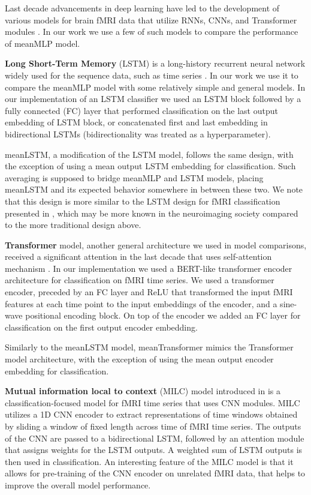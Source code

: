 \documentclass[final,5p,times,twocolumn,authoryear]{elsarticle}
\begin{document}
Last decade advancements in deep learning have led to the development of various models for brain fMRI data that utilize RNNs, CNNs, and Transformer modules \citep{dl_review}. In our work we use a few of such models to compare the performance of meanMLP model. 

\noindent \textbf{Long Short-Term Memory} (LSTM) is a long-history recurrent neural network widely used for the sequence data, such as time series \citep{lstm}. In our work we use it to compare the meanMLP model with some relatively simple and general models. In our implementation of an LSTM classifier we used an LSTM block \citep{lstm} followed by a fully connected (FC) layer that performed classification on the last output embedding of LSTM block, or concatenated first and last embedding in bidirectional LSTMs (bidirectionality was treated as a hyperparameter).

meanLSTM, a modification of the LSTM model, follows the same design, with the exception of using a mean output LSTM embedding for classification. Such averaging is supposed to bridge meanMLP and LSTM models, placing meanLSTM and its expected behavior somewhere in between these two. We note that this design is more similar to the LSTM design for fMRI classification presented in \citep{dvornek}, which may be more known in the neuroimaging society compared to the more traditional design above.

\noindent \textbf{Transformer} model, another general architecture we used in model comparisons, received a significant attention in the last decade that uses self-attention mechanism \citep{attention}. In our implementation we used a BERT-like transformer encoder architecture \citep{bert} for classification on fMRI time series. We used a transformer encoder, preceded by an FC layer and ReLU that transformed the input fMRI features at each time point to the input embeddings of the encoder, and a sine-wave positional encoding block. On top of the encoder we added an FC layer for classification on the first output encoder embedding. 

Similarly to the meanLSTM model, meanTransformer mimics the Transformer model architecture, with the exception of using the mean output encoder embedding for classification.

\noindent \textbf{Mutual information
local to context} (MILC) model introduced in \citep{milc} is a classification-focused model for fMRI time series that uses CNN modules. MILC utilizes a 1D CNN encoder to extract representations of time windows obtained by sliding a window of fixed length across time of fMRI time series. The outputs of the CNN are passed to a bidirectional LSTM, followed by an attention module that assigns weights for the LSTM outputs. A weighted sum of LSTM outputs is then used in classification. An interesting feature of the MILC model is that it allows for pre-training of the CNN encoder on unrelated fMRI data, that helps to improve the overall model performance.
\end{document}

